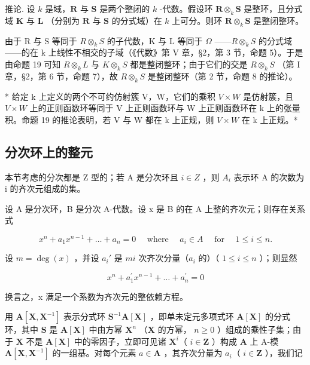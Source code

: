 推论. 设 \(k\) 是域，\(\mathbf{R}\) 与 \(\mathbf{S}\) 是两个整闭的 \(k\) -代数。假设环 \(\mathbf{R} \otimes_k \mathbf{S}\) 是整环，且分式域 \(\mathbf{K}\) 与 \(\mathbf{L}\) （分别为 \(\mathbf{R}\) 与 \(\mathbf{S}\) 的分式域）在 \(k\) 上可分。则环 \(\mathbf{R} \otimes_k \mathbf{S}\) 是整闭整环。

由于 R 与 S 等同于 \(R \otimes_{k} S\) 的子代数，K 与 L 等同于 \(\Omega\) ——\(R \otimes_{k} S\) 的分式域——的在 k 上线性不相交的子域（《代数》第 V 章，§2，第 3 节，命题 5）。于是由命题 19 可知 \(R \otimes_{k} L\) 与 \(K \otimes_{k} S\) 都是整闭整环；由于它们的交是 \(R \otimes_{k} S\) （第 I 章，§2，第 6 节，命题 7），故 \(R \otimes_{k} S\) 是整闭整环（第 2 节，命题 8 的推论）。

* 给定 k 上定义的两个不可约仿射簇 V，W，它们的乘积 \(V \times W\) 是仿射簇，且 \(V \times W\) 上的正则函数环等同于 V 上正则函数环与 W 上正则函数环在 k 上的张量积。命题 19 的推论表明，若 V 与 W 都在 k 上正规，则 \(V \times W\) 在 k 上正规。*

\subsection{分次环上的整元}

本节考虑的分次都是 Z 型的；若 A 是分次环且 \(i \in Z\) ，则 \(A_{i}\) 表示环 A 的次数为 i 的齐次元组成的集。

设 A 是分次环，B 是分次 A-代数。设 x 是 B 的在 A 上整的齐次元；则存在关系式

\[
x ^ {n} + a _ {1} x ^ {n - 1} + \dots + a _ {n} = 0 \quad \text { where } \quad a _ {i} \in A \quad \text { for } \quad 1 \leqslant i \leqslant n.\tag{3}
\]

设 \(m = \deg(x)\) ，并设 \(a_i'\) 是 \(mi\) 次齐次分量（\(a_i\) 的）（ \(1 \leqslant i \leqslant n\) ）；则显然

\[
x ^ {n} + a _ {1} ^ {\prime} x ^ {n - 1} + \dots + a _ {n} ^ {\prime} = 0\tag{4}
\]

换言之，x 满足一个系数为齐次元的整依赖方程。

用 \(\mathbf{A}[\mathbf{X},\mathbf{X}^{-1}]\) 表示分式环 \(\mathbf{S}^{-1}\mathbf{A}[\mathbf{X}]\) ，即单未定元多项式环 \(\mathbf{A}[\mathbf{X}]\) 的分式环，其中 \(\mathbf{S}\) 是 \(\mathbf{A}[\mathbf{X}]\) 中由方幂 \(\mathbf{X}^n\) （\(\mathbf{X}\) 的方幂， \(n\geqslant 0\) ）组成的乘性子集；由于 \(\mathbf{X}\) 不是 \(\mathbf{A}[\mathbf{X}]\) 中的零因子，立即可见诸 \(\mathbf{X}^i\)（ \(i\in \mathbf{Z}\) ）构成 \(\mathbf{A}\) 上 A-模 \(\mathbf{A}[\mathbf{X},\mathbf{X}^{-1}]\) 的一组基。对每个元素 \(a\in \mathbf{A}\) ，其齐次分量为 \(a_{i}\)（ \(i\in \mathbf{Z}\) ），我们记

